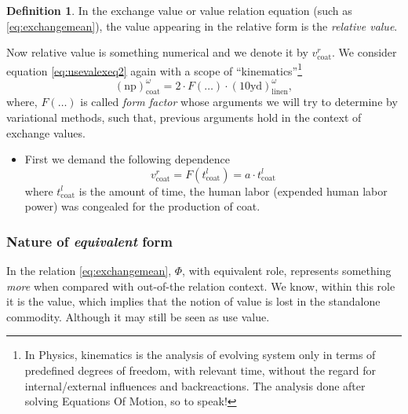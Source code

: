 \documentclass[12pt]{extarticle}
\theoremstyle{definition}
\newtheorem{definition}{Definition}[section]
\begin{document}
\begin{definition}
  \label{def:relval}
  In the exchange value or value relation equation (such as \ref{eq:exchangemean}), the value appearing in the relative form is the \emph{relative value}.
\end{definition}

Now relative value is something numerical and we denote it by $v_{\text{coat}}^{r}$.  We consider equation \ref{eq:usevalexeq2} again with a scope of ``kinematics''\footnote{In Physics, kinematics is the analysis of evolving system only in terms of predefined degrees of freedom, with relevant time, without the regard for internal/external influences and backreactions.  The analysis done after solving Equations Of Motion, so to speak!}
\begin{equation}
  (\text{np})_{\text{coat}}^{\omega} = 2\cdot F(\ldots)\cdot (10\text{yd})_{\text{linen}}^{\omega},
\end{equation}
where, $F(\ldots)$ is called \emph{form factor} whose arguments we will try to determine by variational methods, such that, previous arguments hold in the context of exchange values.


\begin{itemize}
\item First we demand the following dependence
  \begin{equation}
  v_{\text{coat}}^{r} = F(t_{\text{coat}}^l) = a\cdot t_{\text{coat}}^l 
\end{equation}
where $t_{\text{coat}}^l$ is the amount of time, the human labor (expended human labor power) was congealed for the production of coat.
\end{itemize}

\subsubsection{Nature of \emph{equivalent} form}
In the relation \ref{eq:exchangemean}, $\Phi$, with equivalent role, represents something \emph{more} when compared with out-of-the relation context.  We know, within this role it is the value, which implies that the notion of value is lost in the standalone commodity.  Although it may still be seen as use value.



\end{document}

